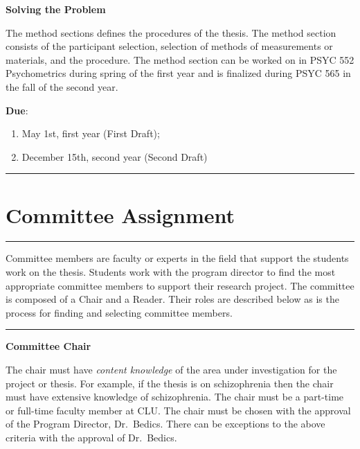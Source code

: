 \documentclass[openany]{book}
\providecommand{\tightlist}{%
  \setlength{\itemsep}{0pt}\setlength{\parskip}{0pt}}
\begin{document}
\textbf{Solving the Problem}

The method sections defines the procedures of the thesis. The method section consists of the participant selection, selection of methods of measurements or materials, and the procedure. The method section can be worked on in PSYC 552 Psychometrics during spring of the first year and is finalized during PSYC 565 in the fall of the second year.

\textbf{Due}:

\begin{enumerate}
\def\labelenumi{\arabic{enumi}.}
\tightlist
\item
  May 1st, first year (First Draft);
\item
  December 15th, second year (Second Draft)
\end{enumerate}

\begin{center}\rule{0.5\linewidth}{0.5pt}\end{center}

\hypertarget{committee-assignment}{%
\section{Committee Assignment}\label{committee-assignment}}

\begin{center}\rule{0.5\linewidth}{0.5pt}\end{center}

Committee members are faculty or experts in the field that support the students work on the thesis. Students work with the program director to find the most appropriate committee members to support their research project. The committee is composed of a Chair and a Reader. Their roles are described below as is the process for finding and selecting committee members.

\begin{center}\rule{0.5\linewidth}{0.5pt}\end{center}

\textbf{Committee Chair}

The chair must have \emph{content knowledge} of the area under investigation for the project or thesis. For example, if the thesis is on schizophrenia then the chair must have extensive knowledge of schizophrenia. The chair must be a part-time or full-time faculty member at CLU. The chair must be chosen with the approval of the Program Director, Dr.~Bedics. There can be exceptions to the above criteria with the approval of Dr.~Bedics.
\end{document}
